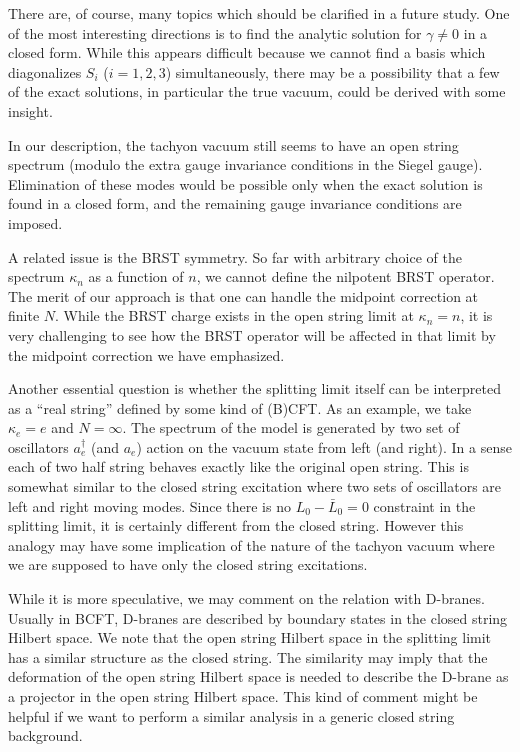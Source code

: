 \documentclass[a4paper,aps,preprint,nofootinbib,eqsecnum]{revtex4}
\begin{document}
There are, of course, many topics which should be clarified in a
future study. One of the most interesting directions is to find
the analytic solution for $\gamma \neq 0$ in a closed form. While
this appears difficult because we cannot find a basis which
diagonalizes $S_{i}$ ($i=1,2,3$) simultaneously, there may be a
possibility that a few of the exact solutions, in particular the
true vacuum, could be derived with some insight.

In our description, the tachyon vacuum still seems to have an open
string spectrum (modulo the extra gauge invariance conditions in
the Siegel gauge). Elimination of these modes would be possible
only when the exact solution is found in a closed form, and the
remaining gauge invariance conditions are imposed.

A related issue is the BRST symmetry. So far with arbitrary choice
of the spectrum $\kappa _{n}$ as a function of $n$, we cannot
define the nilpotent BRST operator. The merit of our approach is
that one can handle the midpoint correction at finite $N$. While
the BRST charge exists in the open string limit at $\kappa
_{n}=n$, it is very challenging to see how the BRST operator will
be affected in that limit by the midpoint correction we have
emphasized.

Another essential question is whether the splitting limit itself
can be interpreted as a ``real string'' defined by some kind of
(B)CFT. As an example, we take $\kappa_e=e$ and $N=\infty$. The
spectrum of the model is generated by two set of oscillators
$a^\dagger_e$ (and $a_e$) action on the vacuum state from left
(and right). In a sense each of two half string behaves exactly
like the original open string. This is somewhat similar to the
closed string excitation where two sets of oscillators are left
and right moving modes. Since there is no $L_0-\bar{L}_0=0$
constraint in the splitting limit, it is certainly different from
the closed string. However this analogy may have some implication
of the nature of the tachyon vacuum where we are supposed to have
only the closed string excitations.

While it is more speculative, we may comment on the relation with
D-branes. Usually in BCFT, D-branes are described by boundary
states in the closed string Hilbert space. We note that the open
string Hilbert space in the splitting limit has a similar
structure as the closed string. The similarity may imply that the
deformation of the open string Hilbert space is needed to describe
the D-brane as a projector in the open string Hilbert space. This
kind of comment might be helpful if we want to perform a similar
analysis in a generic closed string background.
\end{document}
